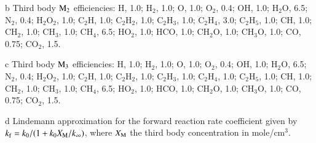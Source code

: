 \documentclass{warpdoc}
\begin{document}
\begin{table}[h]
\begin{center}
\begin{threeparttable}
\begin{tablenotes}
\item[{b}] Third body $\rm M_2$ efficiencies: H, 1.0; H$_2$, 1.0; O, 1.0; O$_2$, 0.4; OH, 1.0; H$_2$O, 6.5; N$_2$, 0.4; H$_2$O$_2$, 1.0;
   C$_2$H, 1.0; C$_2$H$_2$, 1.0; C$_2$H$_3$, 1.0; C$_2$H$_4$, 3.0; C$_2$H$_5$, 1.0; CH, 1.0; CH$_2$, 1.0; CH$_3$, 1.0; CH$_4$, 6.5; HO$_2$, 1.0; HCO, 1.0; CH$_2$O, 1.0; CH$_3$O, 1.0; CO, 0.75; CO$_2$, 1.5.

\item[{c}] Third body $\rm M_3$ efficiencies: H, 1.0; H$_2$, 1.0; O, 1.0; O$_2$, 0.4; OH, 1.0; H$_2$O, 6.5; N$_2$, 0.4; H$_2$O$_2$, 1.0;
   C$_2$H, 1.0; C$_2$H$_2$, 1.0; C$_2$H$_3$, 1.0; C$_2$H$_4$, 1.0; C$_2$H$_5$, 1.0; CH, 1.0; CH$_2$, 1.0; CH$_3$, 1.0; CH$_4$, 6.5; HO$_2$, 1.0; HCO, 1.0; CH$_2$O, 1.0; CH$_3$O, 1.0; CO, 0.75; CO$_2$, 1.5.
   
\item[{d}] Lindemann approximation for the forward
reaction rate coefficient given by $k_{\rm f} = k_0 / (1+k_0 X_{\rm M} / k_\infty)$, where $X_{\rm M}$ the third body concentration in mole/cm$^3$.

\end{tablenotes}
\end{threeparttable}
\end{center}
\end{table} 
%
\clearpage


\end{document}
